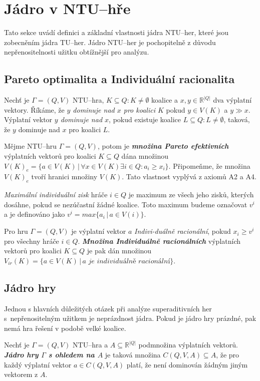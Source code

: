 \section{Jádro v NTU--hře}
    \label{sec:Core}
    Tato sekce uvádí definici a základní vlastnosti jádra NTU--her, které jsou zobecněním jádra TU--her. Jádro NTU--her je pochopitelně z důvodu nepřenositelnosti užitku obtížnější pro analýzu.

    \subsection{Pareto optimalita a Individuální racionalita}
        Nechť je $\Gamma = (Q, V)$ NTU--hra, $K \subseteq Q: K \neq \emptyset$ koalice a $x, y \in \mathbb{R}^{|Q|}$ dva výplatní vektory. Říkáme, že \textit{$y$ dominuje nad $x$ pro koalici $K$} pokud $y \in V(K)$ a $y \gg x$. Výplatní vektor \textit{$y$ dominuje nad $x$}, pokud existuje koalice $L \subseteq Q: L \neq \emptyset$, taková, že $y$ dominuje nad $x$ pro koalici $L$.

        Mějme NTU--hru $\Gamma = (Q, V)$, potom je \textit{\textbf{množina Pareto efektivních}} výplatních vektorů pro koalici $K \subseteq Q$ dána množinou $V(K)_e = \{a \in V(K)\,|\,\forall x \in V(K) \exists i \in Q: a_i \geq x_i\}$. Připomeňme, že množina $V(K)_e$ tvoří hranici množiny $V(K)$. Tato vlastnost vyplývá z axiomů A2 a A4.

        \textit{Maximální individuální zisk} hráče $i \in Q$ je maximum ze všech jeho zisků, kterých dosáhne, pokud se nezúčastní žádné koalice. Toto maximum budeme označovat $v^i$ a je definováno jako $v^i = max\{a_i\,|\, a \in V({i})\}$.

        Pro hru $\Gamma = (Q, V)$ je výplatní vektor $a$ \textit{Indivi-duálně racionální}, pokud $x_i \geq v^i$ pro všechny hráče $i \in Q$. \textit{\textbf{Množina Individuálně racionálních}} výplatních vektorů pro koalici $K \subseteq Q$ je pak dán množinou $V_{ir}(K) = \{a \in V(K)\,|\, a \textit{ je individuálně racionální}\}$.

    \subsection{Jádro hry}
        Jednou s hlavních důležitých otázek při analýze superaditivních her s~nepřenositelným užitkem je neprázdnost jádra. Pokud je jádro hry prázdné, pak nemá hra řešení v podobě velké koalice.

        Nechť je $\Gamma = (Q, V)$ NTU--hra a $A \subseteq \mathbb{R}^{|Q|}$ podmnožina výplatních vektorů. \textit{\textbf{Jádro hry $\Gamma$ s ohledem na $A$}} je taková množina $C(Q, V, A) \subseteq A$, že pro každý výplatní vektor $a \in C(Q, V, A)$ platí, že není dominován žádným jiným vektorem z $A$.


